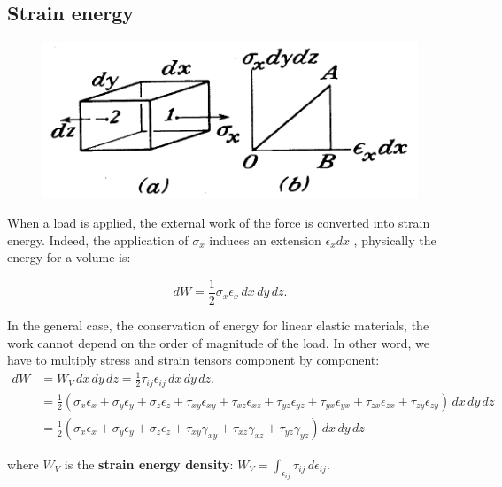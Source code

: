\subsection{Strain energy}
	\begin{figure}
	\vspace{-5mm}	
	\includegraphics[scale=0.3]{ch3/8}
	\label{fig:3.8}
	\end{figure}	
	When a load is applied, the external work of the force is converted into strain energy. Indeed, the application of $\sigma _x$ induces an extension $\epsilon _x dx$ , physically the energy for a volume is:
	
	\begin{equation}
	dW = \frac{1}{2} \sigma _x \epsilon _x \, dx\, dy\, dz.
	\end{equation}
	
	In the general case, the conservation of energy for linear elastic materials, the work cannot depend on the order of magnitude of the load. In other word, we have to multiply stress and strain tensors component by component:
	\begin{equation}
	\begin{aligned}
	dW &= W_V \, dx\, dy\, dz = \frac{1}{2} \tau _{ij} \epsilon _{ij} \, dx\, dy\, dz.\\
	&= \frac{1}{2} (\sigma _x \epsilon _x +\sigma _y \epsilon _y+\sigma _z \epsilon _z + \tau _{xy}\epsilon _{xy}+ \tau _{xz}\epsilon _{xz}+ \tau _{yz}\epsilon _{yz} + \tau _{yx}\epsilon _{yx}+ \tau _{zx}\epsilon _{zx}+ \tau _{zy}\epsilon _{zy}) \, dx\, dy\, dz\\
	&= \frac{1}{2} (\sigma _x \epsilon _x +\sigma _y \epsilon _y+\sigma _z \epsilon _z + \tau _{xy}\gamma _{xy}+ \tau _{xz}\gamma _{xz}+ \tau _{yz}\gamma _{yz}) \, dx\, dy\, dz
	\end{aligned}
	\end{equation}
	
	where $W_V$ is the \textbf{strain energy density}:
	$W_V = \int _{\epsilon _{ij}} \tau _{ij} \, d\epsilon _{ij}.$
	
